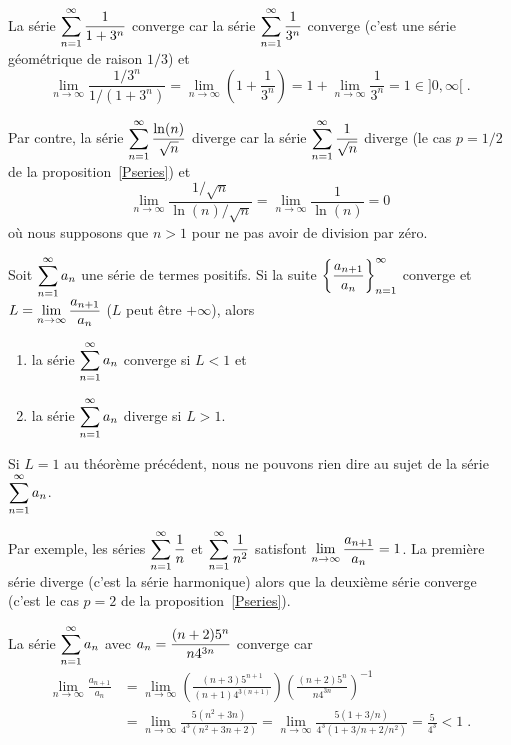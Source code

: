 {\begin{egg}
La série $\displaystyle \sum_{n=1}^\infty \frac{1}{1+3^n}$ converge
car la série $\displaystyle \sum_{n=1}^\infty \frac{1}{3^n}$ converge
(c'est une série géométrique de raison $1/3$) et
\[
\lim_{n\rightarrow \infty} \frac{1/3^n}{1/(1+3^n)} 
= \lim_{n\rightarrow \infty} \left( 1 + \frac{1}{3^n}\right) 
= 1 + \lim_{n\rightarrow \infty}\frac{1}{3^n} = 1 \in ]0,\infty[ \; .
\]

Par contre, la série $\displaystyle \sum_{n=1}^\infty \frac{\ln(n)}{\sqrt{n}}$
diverge car la série $\displaystyle \sum_{n=1}^\infty \frac{1}{\sqrt{n}}$
diverge (le cas $p=1/2$ de la proposition~\ref{Pseries}) et
\[
\lim_{n\rightarrow \infty} \frac{1/\sqrt{n}}{\ln(n)/\sqrt{n}} 
= \lim_{n\rightarrow \infty} \frac{1}{\ln(n)} = 0
\]
où nous supposons que $n>1$ pour ne pas avoir de division par zéro.
\end{egg}

\begin{theorem} \label{Alembert}
Soit $\displaystyle \sum_{n=1}^\infty a_n$ une série de termes
positifs.  Si la suite $\displaystyle \left\{ \frac{a_{n+1}}{a_n}
\right\}_{n=1}^\infty$ converge et
$\displaystyle L = \lim_{n\rightarrow \infty} \frac{a_{n+1}}{a_n}$
($L$ peut être $+\infty$), alors
\begin{enumerate}
\item la série $\displaystyle \sum_{n=1}^\infty a_n$ converge si $L<1$ et
\item la série $\displaystyle \sum_{n=1}^\infty a_n$ diverge si $L>1$.
\end{enumerate}
\end{theorem}

\begin{rmk}
Si $L=1$ au théorème précédent, nous ne pouvons rien dire au sujet de la
série $\displaystyle \sum_{n=1}^\infty a_n$.

Par exemple, les séries $\displaystyle \sum_{n=1}^\infty \frac{1}{n}$
et $\displaystyle \sum_{n=1}^\infty \frac{1}{n^2}$ satisfont
$\displaystyle \lim_{n\rightarrow \infty} \frac{a_{n+1}}{a_n} = 1$.
La première série diverge (c'est la série harmonique) alors que la
deuxième série converge (c'est le cas $p=2$ de la
proposition~\ref{Pseries}).
\label{dAlembert1}
\end{rmk}

\begin{egg}
La série $\displaystyle \sum_{n=1}^\infty a_n$ avec
$\displaystyle a_n = \frac{(n+2)5^n}{n 4^{3n}}$ converge car
\begin{align*}
\lim_{n\rightarrow \infty} \frac{a_{n+1}}{a_n} &=
\lim_{n\rightarrow \infty} \left( \frac{(n+3)5^{n+1}}{(n+1) 4^{3(n+1)}}
\right) \left( \frac{(n+2)5^n}{n 4^{3n}} \right)^{-1} \\
&=\lim_{n\rightarrow \infty} \frac{5(n^2+3n)}{4^3(n^2+3n+2)}
=\lim_{n\rightarrow \infty} \frac{5(1+3/n)}{4^3(1+3/n+2/n^2)}
= \frac{5}{4^3} < 1 \; .
\end{align*}
\end{egg}

}
